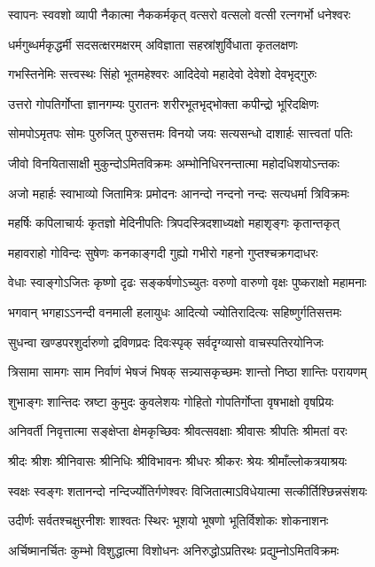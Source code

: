 \twolineshloka
{स्वापनः स्ववशो व्यापी नैकात्मा नैककर्मकृत्}
{वत्सरो वत्सलो वत्सी रत्नगर्भो धनेश्वरः}

\twolineshloka
{धर्मगुब्धर्मकृद्धर्मी सदसत्क्षरमक्षरम्}
{अविज्ञाता सहस्रांशुर्विधाता कृतलक्षणः}

\twolineshloka
{गभस्तिनेमिः सत्त्वस्थः सिंहो भूतमहेश्वरः}
{आदिदेवो महादेवो देवेशो देवभृद्गुरुः}

\twolineshloka
{उत्तरो गोपतिर्गोप्ता ज्ञानगम्यः पुरातनः}
{शरीरभूतभृद्भोक्ता कपीन्द्रो भूरिदक्षिणः}

\twolineshloka
{सोमपोऽमृतपः सोमः पुरुजित् पुरुसत्तमः}
{विनयो जयः सत्यसन्धो दाशार्हः सात्त्वतां पतिः}

\twolineshloka
{जीवो विनयितासाक्षी मुकुन्दोऽमितविक्रमः}
{अम्भोनिधिरनन्तात्मा महोदधिशयोऽन्तकः}

\twolineshloka
{अजो महार्हः स्वाभाव्यो जितामित्रः प्रमोदनः}
{आनन्दो नन्दनो नन्दः सत्यधर्मा त्रिविक्रमः}

\twolineshloka
{महर्षिः कपिलाचार्यः कृतज्ञो मेदिनीपतिः}
{त्रिपदस्त्रिदशाध्यक्षो महाशृङ्गः कृतान्तकृत्}

\twolineshloka
{महावराहो गोविन्दः सुषेणः कनकाङ्गदी}
{गुह्यो गभीरो गहनो गुप्तश्चक्रगदाधरः}

\twolineshloka
{वेधाः स्वाङ्गोऽजितः कृष्णो दृढः सङ्कर्षणोऽच्युतः}
{वरुणो वारुणो वृक्षः पुष्कराक्षो महामनाः}

\twolineshloka
{भगवान् भगहाऽऽनन्दी वनमाली हलायुधः}
{आदित्यो ज्योतिरादित्यः सहिष्णुर्गतिसत्तमः}

\twolineshloka
{सुधन्वा खण्डपरशुर्दारुणो द्रविणप्रदः}
{दिवःस्पृक् सर्वदृग्व्यासो वाचस्पतिरयोनिजः}

\twolineshloka
{त्रिसामा सामगः साम निर्वाणं भेषजं भिषक्}
{सन्न्यासकृच्छमः शान्तो निष्ठा शान्तिः परायणम्}

\twolineshloka
{शुभाङ्गः शान्तिदः स्रष्टा कुमुदः कुवलेशयः}
{गोहितो गोपतिर्गोप्ता वृषभाक्षो वृषप्रियः}

\twolineshloka
{अनिवर्ती निवृत्तात्मा सङ्क्षेप्ता क्षेमकृच्छिवः}
{श्रीवत्सवक्षाः श्रीवासः श्रीपतिः श्रीमतां वरः}

\twolineshloka
{श्रीदः श्रीशः श्रीनिवासः श्रीनिधिः श्रीविभावनः}
{श्रीधरः श्रीकरः श्रेयः श्रीमाँल्लोकत्रयाश्रयः}

\twolineshloka
{स्वक्षः स्वङ्गः शतानन्दो नन्दिर्ज्योतिर्गणेश्वरः}
{विजितात्माऽविधेयात्मा सत्कीर्तिश्छिन्नसंशयः}

\twolineshloka
{उदीर्णः सर्वतश्चक्षुरनीशः शाश्वतः स्थिरः}
{भूशयो भूषणो भूतिर्विशोकः शोकनाशनः}

\twolineshloka
{अर्चिष्मानर्चितः कुम्भो विशुद्धात्मा विशोधनः}
{अनिरुद्धोऽप्रतिरथः प्रद्युम्नोऽमितविक्रमः}

